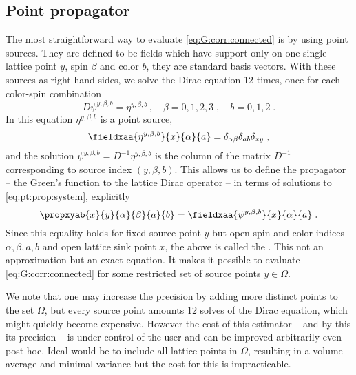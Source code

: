 \subsection{Point propagator}
\label{sec:point:prop}

The most straightforward way to evaluate \cref{eq:G:corr:connected} is by using point sources. They are defined to be fields which have support only on one single lattice point $y$, spin $\beta$ and color $b$, \ie they are standard basis vectors. With these sources as right-hand sides, we solve the Dirac equation \num{12} times, once for each color-spin combination
\begin{equation} \label{eq:pt:prop:system}
D \psi^{y, \beta, b} = \eta^{y, \beta, b} \,,
\quad
\beta = 0,1,2,3 \;,
\quad
b = 0,1,2 \;.
\end{equation}
In this equation $\eta^{y, \beta, b}$ is a point source,
\begin{equation}
\fieldxaa{\eta^{y, \beta, b}}{x}{\alpha}{a} = \delta_{\alpha \beta} \delta_{ab} \delta_{xy} \;,
\end{equation}
and the solution $\psi^{y, \beta, b} = D^{-1} \eta^{y, \beta, b}$ is the column of the matrix $D^{-1}$ corresponding to source index $(y, \beta, b)$.
This allows us to define the propagator -- the Green's function to the lattice Dirac operator -- in terms of solutions to \cref{eq:pt:prop:system}, explicitly
\begin{equation} \label{eq:prop:pt-to-all}
\propxyab{x}{y}{\alpha}{\beta}{a}{b} = \fieldxaa{\psi^{y, \beta, b}}{x}{\alpha}{a} \;.
\end{equation}
Since this equality holds for fixed source point $y$ but open spin and color indices $\alpha, \beta, a, b$ and open lattice sink point $x$, the above is called the .
This not an approximation but an exact equation.
It makes it possible to evaluate \cref{eq:G:corr:connected} for some restricted set of source points $y \in \Omega$.

We note that one may increase the precision by adding more distinct points to the set $\Omega$, but every source point amounts \num{12} solves of the Dirac equation, which might quickly become expensive.
However the cost of this estimator -- and by this its precision -- is under control of the user and can be improved arbitrarily even post hoc.
Ideal would be to include all lattice points in $\Omega$, resulting in a volume average and minimal variance but the cost for this is impracticable.

